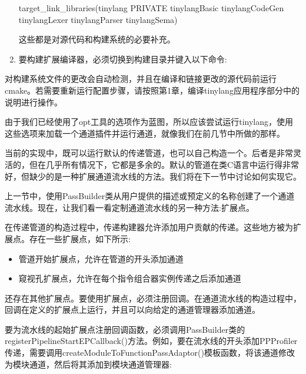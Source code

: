 \begin{enumerate}
\begin{cmake}
target_link_libraries(tinylang
    PRIVATE tinylangBasic tinylangCodeGen
    tinylangLexer tinylangParser tinylangSema)
\end{cmake}

这些都是对源代码和构建系统的必要补充。

\item
要构建扩展编译器，必须切换到构建目录并键入以下命令:


\end{enumerate}

对构建系统文件的更改会自动检测，并且在编译和链接更改的源代码前运行cmake。若需要重新运行配置步骤，请按照第1章，编译tinylang应用程序部分中的说明进行操作。

由于我们已经使用了opt工具的选项作为蓝图，所以应该尝试运行tinylang，使用这些选项来加载一个通道插件并运行通道，就像我们在前几节中所做的那样。

当前的实现中，既可以运行默认的传递管道，也可以自己构造一个。后者是非常灵活的，但在几乎所有情况下，它都是多余的。默认的管道在类C语言中运行得非常好，但缺少的是一种扩展通道流水线的方法。我们将在下一节中讨论如何实现它。


上一节中，使用PassBuilder类从用户提供的描述或预定义的名称创建了一个通道流水线。现在，让我们看一看定制通道流水线的另一种方法:扩展点。

在传递管道的构造过程中，传递构建器允许添加用户贡献的传递。这些地方被为扩展点。存在一些扩展点，如下所示:

\begin{itemize}
\item
管道开始扩展点，允许在管道的开头添加通道

\item
窥视孔扩展点，允许在每个指令组合器实例传递之后添加通道
\end{itemize}

还存在其他扩展点。要使用扩展点，必须注册回调。在通道流水线的构造过程中，回调在定义的扩展点上运行，并且可以向给定的通道管理器添加通道。

要为流水线的起始扩展点注册回调函数，必须调用PassBuilder类的registerPipelineStartEPCallback()方法。例如，要在流水线的开头添加PPProfiler传递，需要调用createModuleToFunctionPassAdaptor()模板函数，将该通道修改为模块通道，然后将其添加到模块通道管理器:

